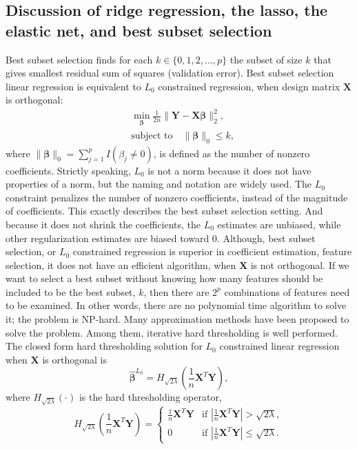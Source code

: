 \subsection{Discussion of ridge regression, the lasso, the elastic net, and best subset selection}
Best subset selection finds for each $k\in\{0,1,2,\dots,p\}$ the subset of size $k$ that gives smallest residual sum of squares (validation error). Best subset selection linear regression is equivalent to $L_0$ constrained regression, when design matrix $\bm{X}$ is orthogonal:
\begin{equation}
\begin{aligned}
    &\min_{\bm{\beta}} \frac{1}{2n}\|\bm{Y}-\bm{X\beta}\|_2^2, \\
    &\text{subject to} \quad \|\bm{\beta}\|_0 \leq k, \label{eq1.12}
\end{aligned}
\end{equation}
where $\|\bm{\beta}\|_0=\sum_{j=1}^p I(\beta_j \neq 0)$, is defined as the number of nonzero coefficients. Strictly speaking, $L_0$ is not a norm because it does not have properties of a norm, but the naming and notation are widely used. The $L_0$ constraint penalizes the number of nonzero coefficients, instead of the magnitude of coefficients. This exactly describes the best subset selection setting. And because it does not shrink the coefficients, the $L_0$ estimates are unbiased, while other regularization estimates are biased toward 0. Although, best subset selection, or $L_0$ constrained regression is superior in coefficient estimation, feature selection, it does not have an efficient algorithm, when $\bm{X}$ is not orthogonal. If we want to select a best subset without knowing how many features should be included to be the best subset, $k$, then there are $2^p$ combinations of features need to be examined. In other words, there are no polynomial time algorithm to solve it; the problem is NP-hard. Many approximation methods have been proposed to solve the problem. Among them, iterative hard thresholding is well performed. The closed form hard thresholding solution for $L_0$ constrained linear regression when $\bm{X}$ is orthogonal is   
\begin{equation}
    \hat{\bm{\beta}}^{L_0}=H_{\sqrt{2\lambda}}(\frac{1}{n}\bm{X}^T\bm{Y}), \label{eq1.13}
\end{equation}
where $H_{\sqrt{2\lambda}}(\cdot)$ is the hard thresholding operator,
\begin{equation}
    H_{\sqrt{2\lambda}}(\frac{1}{n}\bm{X}^T\bm{Y})=
    \begin{cases}
        \frac{1}{n}\bm{X}^T\bm{Y} & \text{if $|\frac{1}{n}\bm{X}^T\bm{Y}|>\sqrt{2\lambda}$}, \\
        0 & \text{if $|\frac{1}{n}\bm{X}^T\bm{Y}|\leq\sqrt{2\lambda}$}.
    \end{cases}
\end{equation}
